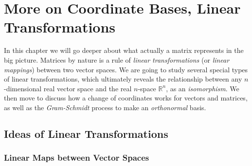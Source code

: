 \chapter{More on Coordinate Bases, Linear Transformations}
\label{chap:6x}

In this chapter we will go deeper about what actually a matrix represents in the big picture. Matrices by nature is a rule of \textit{linear transformations} (or \textit{linear mappings}) between two vector spaces. We are going to study several special types of linear transformations, which ultimately reveals the relationship between any $n$-dimensional real vector space and the real $n$-space $\mathbb{R}^n$, as an \textit{isomorphism}. We then move to discuss how a change of coordinates works for vectors and matrices, as well as the \textit{Gram-Schmidt} process to make an \textit{orthonormal} basis.

\section{Ideas of Linear Transformations}
\label{section:lineartrans}

\subsection{Linear Maps between Vector Spaces}


